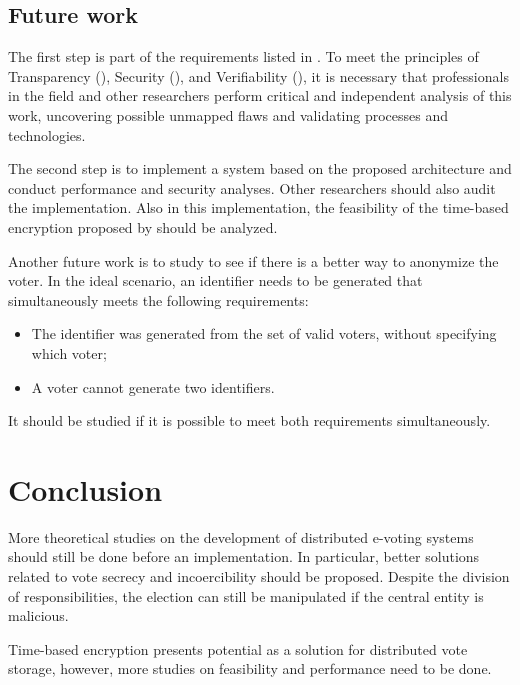 \documentclass[english]{textolivre}
\begin{document}
\subsection{Future work \label{sec-future}}

The first step is part of the requirements listed in . To meet the principles of Transparency (), Security (), and Verifiability (), it is necessary that professionals in the field and other researchers perform critical and independent analysis of this work, uncovering possible unmapped flaws and validating processes and technologies.

The second step is to implement a system based on the proposed architecture and conduct performance and security analyses. Other researchers should also audit the implementation. Also in this implementation, the feasibility of the time-based encryption proposed by \textcite{Liu} should be analyzed.

Another future work is to study to see if there is a better way to anonymize the voter. In the ideal scenario, an identifier needs to be generated that simultaneously meets the following requirements:

\begin{itemize}
 \item The identifier was generated from the set of valid voters, without specifying which voter;
 
 \item A voter cannot generate two identifiers.
\end{itemize}

It should be studied if it is possible to meet both requirements simultaneously.

\section{Conclusion \label{sec-conclusion}}

More theoretical studies on the development of distributed e-voting systems should still be done before an implementation. In particular, better solutions related to vote secrecy and incoercibility should be proposed. Despite the division of responsibilities, the election can still be manipulated if the central entity is malicious.

Time-based encryption presents potential as a solution for distributed vote storage, however, more studies on feasibility and performance need to be done.
\end{document}
